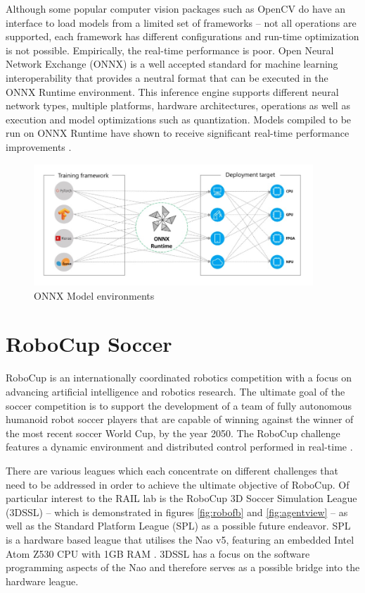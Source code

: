\documentclass[a4paper,twoside,12pt]{report}
\begin{document}
Although some popular computer vision packages such as OpenCV do have an interface to load models from a limited set of frameworks -- not all operations are supported, each framework has different configurations and run-time optimization is not possible. Empirically, the real-time performance is poor. Open Neural Network Exchange (ONNX) is a well accepted standard \citep{onnx} for machine learning interoperability that provides a neutral format that can be executed in the ONNX Runtime environment. This inference engine supports different neural network types, multiple platforms, hardware architectures, operations as well as execution and model optimizations such as quantization. Models compiled to be run on ONNX Runtime have shown to receive significant real-time performance improvements \citep{inference}.

\begin{figure}[h!]
\begin{center}
\includegraphics[width=10.5cm]{images/onnx.jpg}
\caption{ONNX Model environments \citep{onnx}}
\label{fig:onnxplot}
\end{center}
\end{figure}

\section{RoboCup Soccer}
RoboCup is an internationally coordinated robotics competition with a focus on advancing artificial intelligence and robotics research. The ultimate goal of the soccer competition is to support the development of a team of fully autonomous humanoid robot soccer players that are capable of winning against the winner of the most recent soccer World Cup, by the year 2050. The RoboCup challenge features a dynamic environment and distributed control performed in real-time \citep{RoboCupObj}.\

There are various leagues which each concentrate on different challenges that need to be addressed in order to achieve the ultimate objective of RoboCup. Of particular interest to the RAIL lab is the RoboCup 3D Soccer Simulation League (3DSSL) -- which is demonstrated in figures \ref{fig:robofb} and \ref{fig:agentview} -- as well as the Standard Platform League (SPL) as a possible future endeavor. SPL is a hardware based league that utilises the Nao v5, featuring an embedded Intel Atom Z530 CPU with 1GB RAM \citep{naov5}. 3DSSL has a focus on the software programming aspects of the Nao and therefore serves as a possible bridge into the hardware league.
\end{document}

